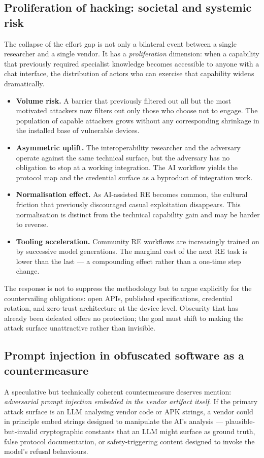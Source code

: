 \documentclass[11pt,a4paper]{article}
\begin{document}
\subsection{Proliferation of hacking: societal and systemic risk}
\label{sec:disc-proliferation}
The collapse of the effort gap is not only a bilateral event between a
single researcher and a single vendor. It has a \emph{proliferation}
dimension: when a capability that previously required specialist knowledge
becomes accessible to anyone with a chat interface, the distribution of
actors who can exercise that capability widens dramatically.

\begin{itemize}
  \item \textbf{Volume risk.} A barrier that previously filtered out all
        but the most motivated attackers now filters out only those who
        choose not to engage. The population of capable attackers grows
        without any corresponding shrinkage in the installed base of
        vulnerable devices.
  \item \textbf{Asymmetric uplift.} The interoperability researcher and
        the adversary operate against the same technical surface, but the
        adversary has no obligation to stop at a working integration.
        The AI workflow yields the protocol map and the credential surface
        as a byproduct of integration work.
  \item \textbf{Normalisation effect.} As AI-assisted RE becomes common,
        the cultural friction that previously discouraged casual
        exploitation disappears. This normalisation is distinct from the
        technical capability gain and may be harder to reverse.
  \item \textbf{Tooling acceleration.} Community RE workflows are
        increasingly trained on by successive model generations. The
        marginal cost of the next RE task is lower than the last --- a
        compounding effect rather than a one-time step change.
\end{itemize}

The response is not to suppress the methodology but to argue explicitly
for the countervailing obligations: open APIs, published specifications,
credential rotation, and zero-trust architecture at the device level.
Obscurity that has already been defeated offers no protection; the goal
must shift to making the attack surface unattractive rather than
invisible.

\subsection{Prompt injection in obfuscated software as a countermeasure}
\label{sec:disc-prompt-injection}
A speculative but technically coherent countermeasure deserves mention:
\emph{adversarial prompt injection embedded in the vendor artifact itself}.
If the primary attack surface is an LLM analysing vendor code or APK
strings, a vendor could in principle embed strings designed to manipulate
the AI's analysis --- plausible-but-invalid cryptographic constants that
an LLM might surface as ground truth, false protocol documentation, or
safety-triggering content designed to invoke the model's refusal
behaviours.
\end{document}
